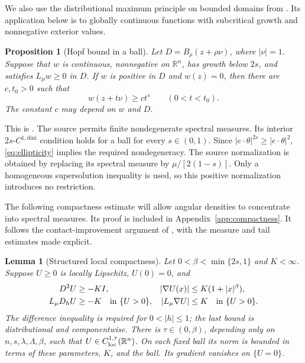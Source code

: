 \documentclass[11pt]{article}
\numberwithin{equation}{section}
\newtheorem{proposition}[theorem]{Proposition}
\newtheorem{lemma}[theorem]{Lemma}
\theoremstyle{remark}
\newcommand{\R}{\mathbb R}
\newcommand{\abs}[1]{\lvert #1\rvert}
\begin{document}
We also use the distributional maximum principle on bounded domains from \cite[Lemma 2.3.5]{FRO}. Its application below is to globally continuous functions with subcritical growth and nonnegative exterior values.

\begin{proposition}[Hopf bound in a ball]\label{prop:hopf}
Let $D=B_\rho(z+\rho\nu)$, where $\abs\nu=1$. Suppose that $w$ is continuous, nonnegative on $\R^n$, has growth below $2s$, and satisfies $L_\mu w\ge0$ in $D$. If $w$ is positive in $D$ and $w(z)=0$, then there are $c,t_0>0$ such that
\begin{equation}\label{eq:hopf}
 w(z+t\nu)\ge ct^s\qquad(0<t<t_0).
\end{equation}
The constant $c$ may depend on $w$ and $D$.
\end{proposition}
This is \cite[Proposition 1.7(3), Proposition 6.7]{GrubeHopf}. The source permits finite nondegenerate spectral measures. Its interior $2s$-$C^{1,\mathrm{dini}}$ condition holds for a ball for every $s\in(0,1)$. Since $\abs{e\cdot\theta}^{2s}\ge\abs{e\cdot\theta}^2$, \eqref{eq:ellipticity} implies the required nondegeneracy. The source normalization is obtained by replacing its spectral measure by $\mu/[2(1-s)]$. Only a homogeneous supersolution inequality is used, so this positive normalization introduces no restriction.

The following compactness estimate will allow angular densities to concentrate into spectral measures. Its proof is included in Appendix~\ref{app:compactness}. It follows the contact-improvement argument of \cite[Proposition 3.8 and Lemma 3.9]{ROW}, with the measure and tail estimates made explicit.

\begin{lemma}[Structured local compactness]\label{lem:compactness}
Let $0<\beta<\min\{2s,1\}$ and $K<\infty$. Suppose $U\ge0$ is locally Lipschitz, $U(0)=0$, and
\begin{align}\label{eq:structured}
 D^2U&\ge-KI,&
 \abs{\nabla U(x)}&\le K(1+\abs{x}^{\beta}),\\
 L_\mu D_hU&\ge-K\quad\hbox{in }\{U>0\},&
 \abs{L_\mu\nabla U}&\le K\quad\hbox{in }\{U>0\}.\notag
\end{align}
The difference inequality is required for $0<\abs h\le1$; the last bound is distributional and componentwise. There is $\tau\in(0,\beta)$, depending only on $n,s,\lambda,\Lambda,\beta$, such that $U\in C^{1,\tau}_{\rm loc}(\R^n)$. On each fixed ball its norm is bounded in terms of these parameters, $K$, and the ball. Its gradient vanishes on $\{U=0\}$.
\end{lemma}
\end{document}
